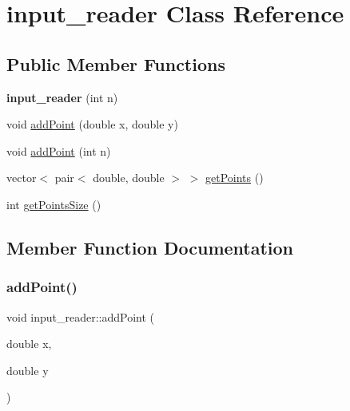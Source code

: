 \hypertarget{classinput__reader}{}\section{input\+\_\+reader Class Reference}
\label{classinput__reader}
\subsection*{Public Member Functions}
\begin{DoxyCompactItemize}
\item 
\mbox{\label{classinput__reader_aadeb60b20063eb1530d8527495d5893a}} 
{\bfseries input\+\_\+reader} (int n)
\item 
void \hyperlink{classinput__reader_a7f653279d6a7ca894b6b67b0aec373ff}{add\+Point} (double x, double y)
\item 
void \hyperlink{classinput__reader_af90c2628a1731f7948f9026fec919ec7}{add\+Point} (int n)
\item 
vector$<$ pair$<$ double, double $>$ $>$ \hyperlink{classinput__reader_a8c77c4d25ef4bfe70a1044fcddc427c4}{get\+Points} ()
\item 
int \hyperlink{classinput__reader_a43515656ecf3e997ca8e18fdc20385d8}{get\+Points\+Size} ()
\end{DoxyCompactItemize}


\subsection{Member Function Documentation}
\mbox{\label{classinput__reader_a7f653279d6a7ca894b6b67b0aec373ff}} 
\subsubsection{\texorpdfstring{add\+Point()}{addPoint()}\hspace{0.1cm}{\footnotesize\ttfamily [1/2]}}
{\footnotesize\ttfamily void input\+\_\+reader\+::add\+Point (\begin{DoxyParamCaption}\item[{double}]{x,  }\item[{double}]{y }\end{DoxyParamCaption})\hspace{0.3cm}{\ttfamily [inline]}}

